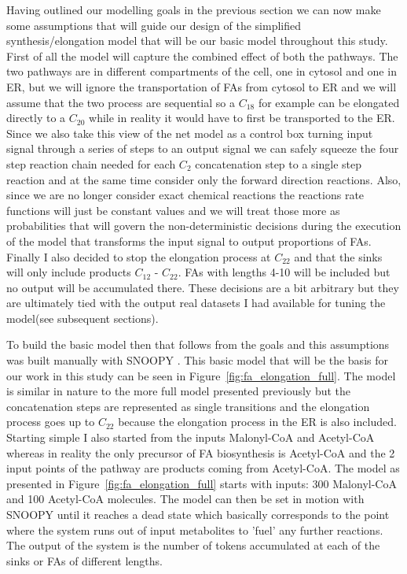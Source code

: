 Having outlined our modelling goals in the previous section we can now
make some assumptions that will guide our design of the simplified
synthesis/elongation model that will be our basic model throughout
this study. First of all the model will capture the combined effect of
both the pathways. The two pathways are in different compartments of
the cell, one in cytosol and one in ER, but we will ignore the
transportation of FAs from cytosol to ER and we will assume that the
two process are sequential so a $C_{18}$ for example can be elongated
directly to a $C_{20}$ while in reality it would have to first be
transported to the ER. Since we also take this view of the
net model as a control box turning input signal through a series of
steps to an output signal we can safely squeeze the four step reaction chain
needed for each $C_2$ concatenation step to a single step reaction and
at the same time consider only the forward direction
reactions. Also, since we are no longer consider exact chemical
reactions the reactions rate functions will just be constant values
and we will treat those more as probabilities that will govern the
non-deterministic decisions during the execution of the model that
transforms the input signal to output proportions of FAs. Finally I
also decided to stop the elongation process at $C_{22}$ and that the
sinks will only include products $C_{12}$ - $C_{22}$. FAs with lengths
4-10 will be included but no output will be accumulated there. These
decisions are a bit arbitrary but they are ultimately tied with the
output real datasets I had available for tuning the model(see
subsequent sections).

To build the basic model then that follows from the goals and this
assumptions was built manually with SNOOPY \cite [] {heiner2012snoopy}. This basic model that will
be the basis for our work in this study can be seen in
Figure~\ref{fig:fa_elongation_full}. The model is similar in nature to
the more full model presented previously but the concatenation steps
are represented as single transitions and the elongation process goes
up to $C_{22}$ because the elongation process in the ER is also
included. Starting simple I also started from the inputs Malonyl-CoA
and Acetyl-CoA whereas in reality the only precursor of FA
biosynthesis is Acetyl-CoA and the 2 input points of the pathway are
products coming from Acetyl-CoA. The model as presented in
Figure~\ref{fig:fa_elongation_full} starts with inputs: 300
Malonyl-CoA and 100 Acetyl-CoA molecules. The model can then be set in
motion with SNOOPY until it reaches a dead state which basically
corresponds to the point where the system runs out of input
metabolites to 'fuel' any further reactions. The output of the system
is the number of tokens accumulated at each of the sinks or FAs of
different lengths.

